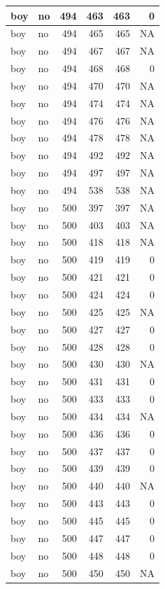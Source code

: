 \documentclass[man]{apa6}
\begin{document}
\begin{tabular}{l|l|r|r|r|r}
\hline
boy & no & 494 & 463 & 463 & 0\\
\hline
boy & no & 494 & 465 & 465 & NA\\
\hline
boy & no & 494 & 467 & 467 & NA\\
\hline
boy & no & 494 & 468 & 468 & 0\\
\hline
boy & no & 494 & 470 & 470 & NA\\
\hline
boy & no & 494 & 474 & 474 & NA\\
\hline
boy & no & 494 & 476 & 476 & NA\\
\hline
boy & no & 494 & 478 & 478 & NA\\
\hline
boy & no & 494 & 492 & 492 & NA\\
\hline
boy & no & 494 & 497 & 497 & NA\\
\hline
boy & no & 494 & 538 & 538 & NA\\
\hline
boy & no & 500 & 397 & 397 & NA\\
\hline
boy & no & 500 & 403 & 403 & NA\\
\hline
boy & no & 500 & 418 & 418 & NA\\
\hline
boy & no & 500 & 419 & 419 & 0\\
\hline
boy & no & 500 & 421 & 421 & 0\\
\hline
boy & no & 500 & 424 & 424 & 0\\
\hline
boy & no & 500 & 425 & 425 & NA\\
\hline
boy & no & 500 & 427 & 427 & 0\\
\hline
boy & no & 500 & 428 & 428 & 0\\
\hline
boy & no & 500 & 430 & 430 & NA\\
\hline
boy & no & 500 & 431 & 431 & 0\\
\hline
boy & no & 500 & 433 & 433 & 0\\
\hline
boy & no & 500 & 434 & 434 & NA\\
\hline
boy & no & 500 & 436 & 436 & 0\\
\hline
boy & no & 500 & 437 & 437 & 0\\
\hline
boy & no & 500 & 439 & 439 & 0\\
\hline
boy & no & 500 & 440 & 440 & NA\\
\hline
boy & no & 500 & 443 & 443 & 0\\
\hline
boy & no & 500 & 445 & 445 & 0\\
\hline
boy & no & 500 & 447 & 447 & 0\\
\hline
boy & no & 500 & 448 & 448 & 0\\
\hline
boy & no & 500 & 450 & 450 & NA\\

\end{tabular}
\end{document}
